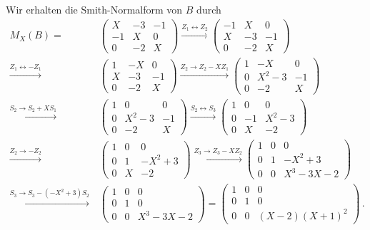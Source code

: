Wir erhalten die Smith-Normalform von $B$ durch
\begin{align*}
    M_X(B)
  =&\,
    \begin{pmatrix}
       X & -3 & -1  \\
      -1 &  X &  0  \\
       0 & -2 &  X
    \end{pmatrix}
  \xrightarrow{Z_1 \leftrightarrow Z_2}
    \begin{pmatrix}
      -1 &  X &  0  \\
       X & -3 & -1  \\
       0 & -2 &  X
    \end{pmatrix}
  \\
  \xrightarrow{Z_1 \leftrightarrow -Z_1}&\,
    \begin{pmatrix}
      1 &  -X &  0  \\
      X &  -3 & -1  \\
      0 &  -2 &  X
    \end{pmatrix}
  \xrightarrow{Z_2 \to Z_2 - X Z_1}
    \begin{pmatrix}
      1 &    -X &  0  \\
      0 & X^2-3 & -1  \\
      0 &    -2 &  X
    \end{pmatrix}
  \\
  \xrightarrow{S_2 \to S_2 + X S_1}&\,
    \begin{pmatrix}
      1 &     0 &  0  \\
      0 & X^2-3 & -1  \\
      0 &    -2 &  X
    \end{pmatrix}
  \xrightarrow{S_2 \leftrightarrow S_3}
    \begin{pmatrix}
      1 &  0  &     0 \\
      0 & -1  & X^2-3 \\
      0 &  X  &    -2
    \end{pmatrix}
  \\
  \xrightarrow{Z_2 \to -Z_2}&\,
    \begin{pmatrix}
      1 & 0 &      0  \\
      0 & 1 & -X^2+3  \\
      0 & X &     -2
    \end{pmatrix}
  \xrightarrow{Z_3 \to Z_3 - X Z_2}
    \begin{pmatrix}
      1 & 0 &        0  \\
      0 & 1 &   -X^2+3  \\
      0 & 0 & X^3-3X-2
    \end{pmatrix}
  \\
  \xrightarrow{S_3 \to S_3 - (-X^2+3) S_2}&\,
    \begin{pmatrix}
      1 & 0 &        0  \\
      0 & 1 &        0  \\
      0 & 0 & X^3-3X-2
    \end{pmatrix}
  =
    \begin{pmatrix}
      1 & 0 &            0  \\
      0 & 1 &            0  \\
      0 & 0 & (X-2)(X+1)^2
    \end{pmatrix} \,.
\end{align*}
